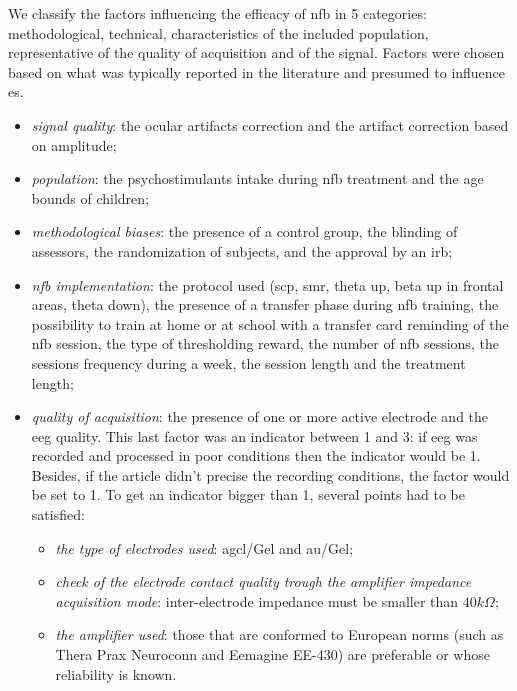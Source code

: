 We classify the factors influencing the efficacy of \gls{nfb} in 5 categories: methodological, technical, characteristics of the included
population, representative of the quality of acquisition and of the signal. 
Factors were chosen based on what was typically reported in the literature and presumed to influence \gls{es}.
\begin{itemize}
\item \emph{signal quality}: the ocular artifacts correction and the artifact correction based on amplitude; 
\item \emph{population}: the psychostimulants intake during \gls{nfb} treatment and the age bounds of children;
\item \emph{methodological biases}: the presence of a control group, the blinding of assessors, 
the randomization of subjects, and the approval by an \gls{irb};
\item \emph{\gls{nfb} implementation}: the protocol used (\gls{scp}, \gls{smr}, 
theta up, beta up in frontal areas, theta down), the presence of a transfer phase during \gls{nfb} training, the possibility to train at home 
or at school with a transfer card reminding of the \gls{nfb} session, 
the type of thresholding reward, the number of \gls{nfb} sessions, the sessions frequency during a week, the session length and the treatment length;
\item \emph{quality of acquisition}: the presence of one or more active electrode and the \gls{eeg} quality. 
This last factor was an indicator between 1 and 3: if \gls{eeg} was recorded and processed in poor conditions then the indicator would be 1. 
Besides, if the article didn't precise the recording conditions, the factor would be set to 1. To get an indicator bigger than 1, several 
points had to be satisfied:
\begin{itemize}
  \item \emph{the type of electrodes used}: \gls{agcl}/Gel and \gls{au}/Gel;
  \item \emph{check of the electrode contact quality trough the amplifier impedance acquisition mode}: inter-electrode impedance must be smaller than $40k \Omega$;  
  \item \emph{the amplifier used}: those that are conformed to European norms (such as Thera Prax \textregistered 
Neuroconn and Eemagine EE-430) are preferable or whose reliability is known.
\end{itemize}
\end{itemize}

